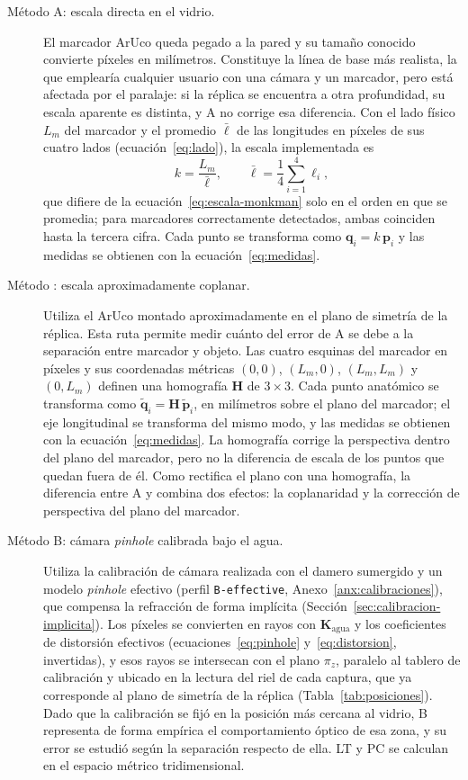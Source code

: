 \begin{description}
  \item[Método A: escala directa en el vidrio.] El marcador ArUco queda pegado a la pared y su tamaño conocido convierte píxeles en milímetros. Constituye la línea de base más realista, la que emplearía cualquier usuario con una cámara y un marcador, pero está afectada por el paralaje: si la réplica se encuentra a otra profundidad, su escala aparente es distinta, y A no corrige esa diferencia. Con el lado físico $L_m$ del marcador y el promedio $\bar{\ell}$ de las longitudes en píxeles de sus cuatro lados (ecuación~\ref{eq:lado}), la escala implementada es
  \begin{equation}
    k = \frac{L_m}{\bar{\ell}}, \qquad \bar{\ell} = \frac{1}{4}\sum_{i=1}^{4} \ell_i,
    \label{eq:escala-impl}
  \end{equation}
  que difiere de la ecuación~\eqref{eq:escala-monkman} solo en el orden en que se promedia; para marcadores correctamente detectados, ambas coinciden hasta la tercera cifra. Cada punto se transforma como $\mathbf{q}_i = k\,\mathbf{p}_i$ y las medidas se obtienen con la ecuación~\eqref{eq:medidas}.
  \item[Método \Aprime: escala aproximadamente coplanar.] Utiliza el ArUco montado aproximadamente en el plano de simetría de la réplica. Esta ruta permite medir cuánto del error de A se debe a la separación entre marcador y objeto. Las cuatro esquinas del marcador en píxeles y sus coordenadas métricas $(0,0)$, $(L_m,0)$, $(L_m,L_m)$ y $(0,L_m)$ definen una homografía $\mathbf{H}$ de $3 \times 3$. Cada punto anatómico se transforma como $\tilde{\mathbf{q}}_i = \mathbf{H}\,\tilde{\mathbf{p}}_i$, en milímetros sobre el plano del marcador; el eje longitudinal se transforma del mismo modo, y las medidas se obtienen con la ecuación~\eqref{eq:medidas}. La homografía corrige la perspectiva dentro del plano del marcador, pero no la diferencia de escala de los puntos que quedan fuera de él. Como \Aprime{} rectifica el plano con una homografía, la diferencia entre A y \Aprime{} combina dos efectos: la coplanaridad y la corrección de perspectiva del plano del marcador.
  \item[Método B: cámara \emph{pinhole} calibrada bajo el agua.] Utiliza la calibración de cámara realizada con el damero sumergido y un modelo \emph{pinhole} efectivo (perfil \texttt{B-effective}, Anexo~\ref{anx:calibraciones}), que compensa la refracción de forma implícita (Sección~\ref{sec:calibracion-implicita}). Los píxeles se convierten en rayos con $\mathbf{K}_{\mathrm{agua}}$ y los coeficientes de distorsión efectivos (ecuaciones~\ref{eq:pinhole} y~\ref{eq:distorsion}, invertidas), y esos rayos se intersecan con el plano $\pi_z$, paralelo al tablero de calibración y ubicado en la lectura del riel de cada captura, que ya corresponde al plano de simetría de la réplica (Tabla~\ref{tab:posiciones}). Dado que la calibración se fijó en la posición más cercana al vidrio, B representa de forma empírica el comportamiento óptico de esa zona, y su error se estudió según la separación respecto de ella. LT y PC se calculan en el espacio métrico tridimensional.

\end{description}
